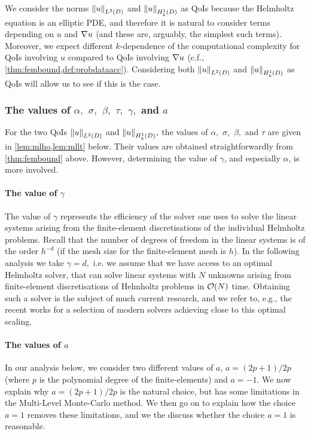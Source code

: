 We consider the norms $\NLtD{u}$ and $\NHokD{u}$ as QoIs because the Helmholtz equation is an elliptic PDE, and therefore it is natural to consider terms depending on $u$ and $\nabla u$ (and these are, arguably, the simplest such terms). Moreover, we expect different $k$-dependence of the computational complexity for QoIs involving $u$ compared to QoIs involving  $\nabla u$ (c.f., \cref{thm:fembound,def:probdataacc}). Considering both $\NLtD{u}$ and $\NHokD{u}$ as QoIs will allow us to see if this is the case.
\ere

\subsubsection{The values of $\alpha,$ $\sigma,$ $\beta,$ $\tau,$ $\gamma,$ and $a$}
For the two QoIs $\NLtD{u}$ and $\NHokD{u},$ the values of $\alpha,$ $\sigma,$ $\beta,$ and $\tau$ are given in \cref{lem:mlho,lem:mllt} below. Their values are obtained straightforwardly from \cref{thm:fembound} above. However, determining the value of $\gamma$, and especially $\alpha$, is more involved.

\paragraph{The value of $\gamma$} The value of $\gamma$ represents the efficiency of the solver one uses to solve the linear systems arising from the finite-element discretisations of the individual Helmholtz problems. Recall that the number of degrees of freedom in the linear systems is of the order $h^{-d}$ (if the mesh size for the finite-element mesh is $h$). In the following analysis we take $\gamma = d,$ i.e. we assume that we have access to an optimal Helmholtz solver, that can solve linear systems with $N$ unknowns arising from finite-element discretisations of Helmholtz problems in $\mathcal O(N)$ time. Obtaining such a solver is the subject of much current research, and we refer to, e.g., the recent works \cite{GrSpVa:17,ZeScHeDe:19,TaZeHeDe:19} for a selection of modern solvers achieving close to this optimal scaling.

\paragraph{The values of $a$} In our analysis below, we consider two different values of $a$, $a=(2p+1)/2p$ (where $p$ is the polynomial degree of the finite-elements) and $a=-1$. We now explain why $a=(2p+1)/2p$ is the natural choice, but has some limitations in the Multi-Level Monte-Carlo method. We then go on to explain how the choice $a=1$ removes these limitations, and we the discuss whether the choice $a=1$ is reasonable.

